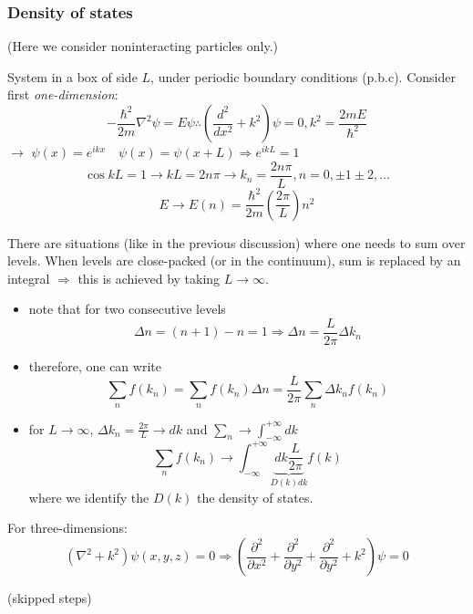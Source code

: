 \documentclass[12pt]{article}
\newcommand{\be}{\begin{equation}}
\newcommand{\ee}{\end{equation}}
\begin{document}

\subsubsection{Density of states}

(Here we consider noninteracting particles only.)

System in a box of side $L$, under periodic
boundary conditions (p.b.c).
Consider first \emph{one-dimension}:
\be
-\frac{\hbar^{2}}{2 m} \nabla^{2} \psi=E \psi \therefore\left(\frac{d^{2}}{d x^{2}}+k^{2}\right) \psi=0, k^{2}=\frac{2 m E}{\hbar^{2}}
\ee
$\rightarrow$ $\psi(x)=e^{i k x} \quad \psi(x)=\psi(x+L) \Rightarrow e^{i k L}=1$
%
\be
\cos k L=1 \rightarrow k L=2 n \pi \rightarrow k_{n}=\frac{2 n \pi}{L}, n=0, \pm 1 \pm 2, \ldots
\ee
%
\be
E \rightarrow E(n)=\frac{\hbar^{2}}{2 m}\left(\frac{2 \pi}{L}\right) n^{2}
\ee

There are situations (like in the previous discussion)
where one needs to sum over levels. When levels
are close-packed (or in the continuum), sum is replaced
by an integral $\Rightarrow$ this is achieved by taking $L \to \infty$.
\begin{itemize}
\item note that for two consecutive levels
\be
\Delta n=(n+1)-n=1 \Rightarrow \Delta n=\frac{L}{2 \pi} \Delta k_{n}
\ee
\item therefore, one can write
\be
\sum_{n} f\left(k_{n}\right)=\sum_{n} f\left(k_{n}\right) \Delta n=\frac{L}{2 \pi} \sum_{n} \Delta k_{n} f\left(k_{n}\right)
\ee
%
\item for $L \to \infty$, $\Delta k_{n}=\frac{2 \pi}{L} \rightarrow dk$ and
$\sum_{n} \rightarrow \int_{-\infty}^{+\infty} d k$ 
\be
\sum_{n} f\left(k_{n}\right) \rightarrow \int_{-\infty}^{+\infty} \underbrace{d k \frac{L}{2 \pi}}%
_{D(k) dk} 
f(k)
\ee
where we identify the $D(k)$ the density of states.
\end{itemize}

For three-dimensions:
\[
\left(\nabla^{2}+k^{2}\right) \psi(x, y, z)=0 \Rightarrow\left(\frac{\partial^{2}}{\partial x^{2}}+\frac{\partial^{2}}{\partial y^{2}}+\frac{\partial^{2}}{\partial y^{2}}+k^{2}\right) \psi=0
\]

(skipped steps)
\end{document}
